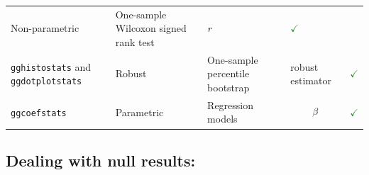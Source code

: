 \documentclass[
]{article}
\begin{document}
\begin{longtable}[]{@{}lllll@{}}
\begin{minipage}[t]{0.16\columnwidth}
Non-parametric\strut
\end{minipage} & \begin{minipage}[t]{0.31\columnwidth}\raggedright
One-sample Wilcoxon signed rank test\strut
\end{minipage} & \begin{minipage}[t]{0.12\columnwidth}\raggedright
\emph{r}\strut
\end{minipage} & \begin{minipage}[t]{0.07\columnwidth}\raggedright
\textcolor{ForestGreen}{$\checkmark$}\strut
\end{minipage}\tabularnewline
\begin{minipage}[t]{0.20\columnwidth}\raggedright
\texttt{gghistostats} and \texttt{ggdotplotstats}\strut
\end{minipage} & \begin{minipage}[t]{0.16\columnwidth}\raggedright
Robust\strut
\end{minipage} & \begin{minipage}[t]{0.31\columnwidth}\raggedright
One-sample percentile bootstrap\strut
\end{minipage} & \begin{minipage}[t]{0.12\columnwidth}\raggedright
robust estimator\strut
\end{minipage} & \begin{minipage}[t]{0.07\columnwidth}\raggedright
\textcolor{ForestGreen}{$\checkmark$}\strut
\end{minipage}\tabularnewline
\begin{minipage}[t]{0.20\columnwidth}\raggedright
\texttt{ggcoefstats}\strut
\end{minipage} & \begin{minipage}[t]{0.16\columnwidth}\raggedright
Parametric\strut
\end{minipage} & \begin{minipage}[t]{0.31\columnwidth}\raggedright
Regression models\strut
\end{minipage} & \begin{minipage}[t]{0.12\columnwidth}\raggedright
\[\beta\]\strut
\end{minipage} & \begin{minipage}[t]{0.07\columnwidth}\raggedright
\textcolor{ForestGreen}{$\checkmark$}\strut
\end{minipage}\tabularnewline
\bottomrule
\end{longtable}

\hypertarget{dealing-with-null-results}{%
\subsection{\texorpdfstring{Dealing with \textbf{null results}:}{Dealing with null results:}}\label{dealing-with-null-results}}
\end{document}
